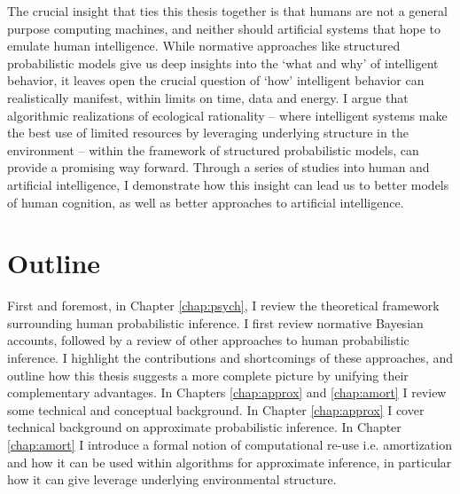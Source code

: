 {The crucial insight that ties this thesis together is that humans are not a general purpose computing machines, and neither should artificial systems that hope to emulate human intelligence. While normative approaches like structured probabilistic models give us deep insights into the `what and why' of intelligent behavior, it leaves open the crucial question of `how' intelligent behavior can realistically manifest, within limits on time, data and energy. I argue that algorithmic realizations of ecological rationality -- where intelligent systems make the best use of limited resources by leveraging underlying structure in the environment -- within the framework of structured probabilistic models, can provide a promising way forward. Through a series of studies into human and artificial intelligence, I demonstrate how this insight can lead us to better models of human cognition, as well as better approaches to artificial intelligence.


\section*{Outline}

First and foremost, in Chapter \ref{chap:psych}, I review the theoretical framework surrounding human probabilistic inference. I first review normative Bayesian accounts, followed by a review of other approaches to human probabilistic inference. I highlight the contributions and shortcomings of these approaches, and outline how this thesis suggests a more complete picture by unifying their complementary advantages. In Chapters \ref{chap:approx} and \ref{chap:amort} I review some technical and conceptual background. In Chapter \ref{chap:approx} I cover technical background on approximate probabilistic inference. In Chapter \ref{chap:amort} I introduce a formal notion of computational re-use i.e. amortization and how it can be used within algorithms for approximate inference, in particular how it can give leverage underlying environmental structure.


}
